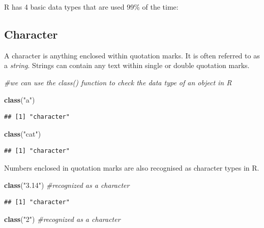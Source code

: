 \documentclass[
]{book}
\newenvironment{Shaded}{\begin{snugshade}}{\end{snugshade}}
\newcommand{\CommentTok}[1]{\textcolor[rgb]{0.56,0.35,0.01}{\textit{#1}}}
\newcommand{\FunctionTok}[1]{\textcolor[rgb]{0.13,0.29,0.53}{\textbf{#1}}}
\newcommand{\NormalTok}[1]{#1}
\newcommand{\StringTok}[1]{\textcolor[rgb]{0.31,0.60,0.02}{#1}}
\begin{document}
R has 4 basic data types that are used 99\% of the time:

\hypertarget{character}{%
\subsection{Character}\label{character}}

A character is anything enclosed within quotation marks. It is often referred to as a \emph{string}. Strings can contain any text within single or double quotation marks.

\begin{Shaded}
\begin{Highlighting}[]
\CommentTok{\#we can use the class() function to check the data type of an object in R}

\FunctionTok{class}\NormalTok{(}\StringTok{"a"}\NormalTok{)}
\end{Highlighting}
\end{Shaded}

\begin{verbatim}
## [1] "character"
\end{verbatim}

\begin{Shaded}
\begin{Highlighting}[]
\FunctionTok{class}\NormalTok{(}\StringTok{"cat"}\NormalTok{)}
\end{Highlighting}
\end{Shaded}

\begin{verbatim}
## [1] "character"
\end{verbatim}

Numbers enclosed in quotation marks are also recognised as character types in R.

\begin{Shaded}
\begin{Highlighting}[]
\FunctionTok{class}\NormalTok{(}\StringTok{"3.14"}\NormalTok{) }\CommentTok{\#recognized as a character}
\end{Highlighting}
\end{Shaded}

\begin{verbatim}
## [1] "character"
\end{verbatim}

\begin{Shaded}
\begin{Highlighting}[]
\FunctionTok{class}\NormalTok{(}\StringTok{"2"}\NormalTok{) }\CommentTok{\#recognized as a character}
\end{Highlighting}
\end{Shaded}
\end{document}

